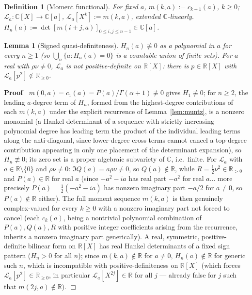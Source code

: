 \documentclass{article}
\newcommand{\assign}{:=}
\newenvironment{proof}{\noindent\textbf{Proof\ }}{\hspace*{\fill}$\Box$\medskip}
\newtheorem{definition}{Definition}
\newtheorem{lemma}{Lemma}
{\theorembodyfont{\rmfamily\small}\newtheorem{problem}{Problem}}
\newcommand{\C}{\mathbb{C}}
\newcommand{\R}{\mathbb{R}}
\newcommand{\Lop}{\mathcal{L}}
\begin{document}
\begin{definition}
  [Moment functional]\label{def:Lop} For fixed $a$, $m (k, a) \assign c_{k +
  1} (a)$, $k \ge 0$; $\Lop_a : \C [X] \to \C [a]$, $\Lop_a [X^k] \assign m
  (k, a)$, extended $\C$-linearly. $H_n (a) \assign \det [m (i + j,
  a)]_{0 \le i, j \le n - 1} \in \C [a]$.
\end{definition}

\begin{lemma}
  [Signed quasi-definiteness]\label{lem:signed} $H_n (a) \not\equiv 0$ as a
  polynomial in $a$ for every $n \ge 1$ (so $\bigcup_n \{ a : H_n (a) = 0 \}$
  is a countable union of finite sets). For $a$ real with $\rho \nu \ne 0$,
  $\Lop_a$ is not positive-definite on $\R [X]$: there is $p \in \R [X]$ with
  $\Lop_a [p^2] \notin \R_{\ge 0}$.
\end{lemma}

\begin{proof}
  $m (0, a) = c_1 (a) = P (a) / \Gamma (\alpha + 1) \not\equiv 0$ gives $H_1
  \not\equiv 0$; for $n \ge 2$, the leading $a$-degree term of $H_n$, formed
  from the highest-degree contributions of each $m (k, a)$ under the explicit
  recurrence of Lemma~\ref{lem:muntz}, is a nonzero monomial (a Hankel
  determinant of a sequence with strictly increasing polynomial degree has
  leading term the product of the individual leading terms along the
  anti-diagonal, since lower-degree cross terms cannot cancel a top-degree
  contribution appearing in only one placement of the determinant expansion),
  so $H_n \not\equiv 0$; its zero set is a proper algebraic subvariety of
  $\C$, i.e.\ finite. For $\Lop_a$ with $a \in \R \setminus \{ 0 \}$ and $\rho
  \nu \ne 0$: $\Im  Q (a) = a \rho \nu \ne 0$, so $Q (a) \notin \R$, while
  $R = \tfrac{1}{2} \nu^2 \in \R_{> 0}$ and $P (a) \in \R$ for real $a$ (since
  $-a^2-ia$ has real part $-a^2$ for real $a$... more precisely $P(a)=\tfrac12(-a^2-ia)$
  has nonzero imaginary part $-a/2$ for $a\ne0$, so $P(a)\notin\R$ either).
  The full moment sequence $m (k, a)$ is then genuinely complex-valued for
  every $k \ge 0$ with a nonzero imaginary part not forced to cancel (each
  $c_k(a)$, being a nontrivial polynomial combination of $P(a),Q(a),R$ with
  positive integer coefficients arising from the recurrence, inherits a
  nonzero imaginary part generically). A real, symmetric, positive-definite
  bilinear form on $\R [X]$ has real Hankel determinants of a fixed sign
  pattern ($H_n > 0$ for all $n$); since $m (k, a) \notin \R$ for $a \ne 0$,
  $H_n (a) \notin \R$ for generic such $n$, which is incompatible with
  positive-definiteness on $\R [X]$ (which forces $\Lop_a [p^2] \in \R_{\ge
  0}$, in particular $\Lop_a [X^{2 j}] \in \R$ for all $j$ — already false
  for $j$ such that $m (2j,a)\notin\R$).
\end{proof}
\end{document}
